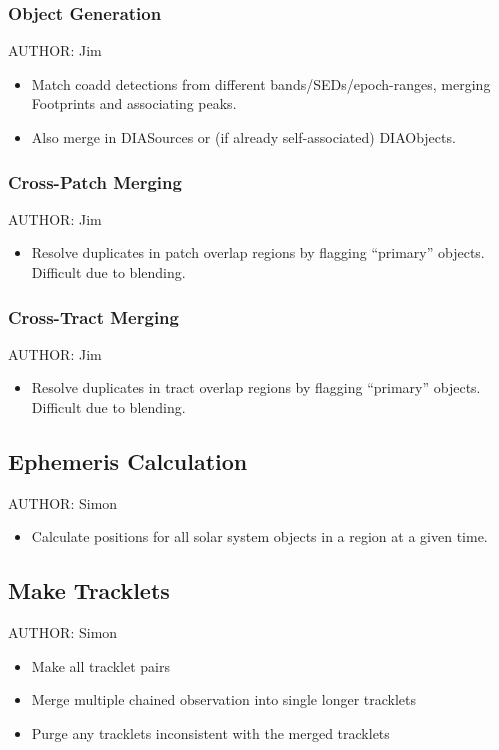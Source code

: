 \subsubsection{Object Generation}
\label{sec:acObjectGeneration}
AUTHOR: Jim
\begin{itemize}
\item Match coadd detections from different bands/SEDs/epoch-ranges, merging Footprints and associating peaks.
\item Also merge in DIASources or (if already self-associated) DIAObjects.
\end{itemize}

\subsubsection{Cross-Patch Merging}
\label{sec:acCrossPatchMerging}
AUTHOR: Jim
\begin{itemize}
\item Resolve duplicates in patch overlap regions by flagging ``primary'' objects.  Difficult due to blending.
\end{itemize}

\subsubsection{Cross-Tract Merging}
\label{sec:acCrossTractMerging}
AUTHOR: Jim
\begin{itemize}
\item Resolve duplicates in tract overlap regions by flagging ``primary'' objects.  Difficult due to blending.
\end{itemize}

\subsection{Ephemeris Calculation}
\label{sec:acEphemerisCalculation}
AUTHOR: Simon
\begin{itemize}
\item Calculate positions for all solar system objects in a region at a given time.
\end{itemize}

\subsection{Make Tracklets}
\label{sec:acMakeTracklets}
AUTHOR: Simon
\begin{itemize}
\item Make all tracklet pairs
\item Merge multiple chained observation into single longer tracklets
\item Purge any tracklets inconsistent with the merged tracklets
\end{itemize}

